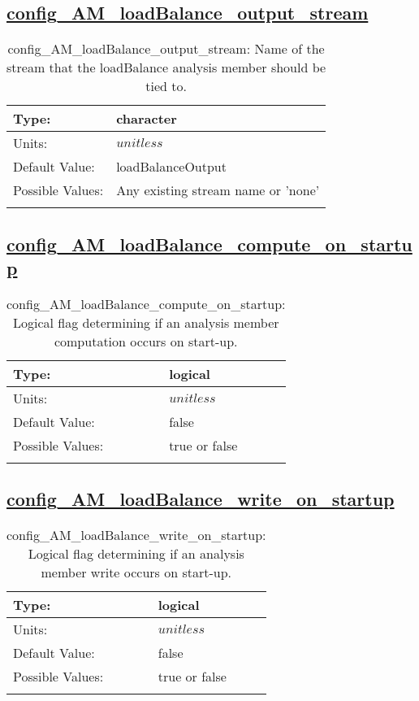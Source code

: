 \subsection[config\_AM\_loadBalance\_output\_stream]{\hyperref[sec:nm_tab_AM_loadBalance]{config\_AM\_loadBalance\_output\_stream}}
\label{subsec:nm_sec_config_AM_loadBalance_output_stream}
\begin{center}
\begin{longtable}{| p{2.0in} || p{4.0in} |}
    \hline
    Type: & character \\
    \hline
    Units: & $unitless$ \\
    \hline
    Default Value: & loadBalanceOutput \\
    \hline
    Possible Values: & Any existing stream name or 'none' \\
    \hline
    \caption{config\_AM\_loadBalance\_output\_stream: Name of the stream that the loadBalance analysis member should be tied to.}
\end{longtable}
\end{center}
\subsection[config\_AM\_loadBalance\_compute\_on\_startup]{\hyperref[sec:nm_tab_AM_loadBalance]{config\_AM\_loadBalance\_compute\_on\_startup}}
\label{subsec:nm_sec_config_AM_loadBalance_compute_on_startup}
\begin{center}
\begin{longtable}{| p{2.0in} || p{4.0in} |}
    \hline
    Type: & logical \\
    \hline
    Units: & $unitless$ \\
    \hline
    Default Value: & false \\
    \hline
    Possible Values: & true or false \\
    \hline
    \caption{config\_AM\_loadBalance\_compute\_on\_startup: Logical flag determining if an analysis member computation occurs on start-up.}
\end{longtable}
\end{center}
\subsection[config\_AM\_loadBalance\_write\_on\_startup]{\hyperref[sec:nm_tab_AM_loadBalance]{config\_AM\_loadBalance\_write\_on\_startup}}
\label{subsec:nm_sec_config_AM_loadBalance_write_on_startup}
\begin{center}
\begin{longtable}{| p{2.0in} || p{4.0in} |}
    \hline
    Type: & logical \\
    \hline
    Units: & $unitless$ \\
    \hline
    Default Value: & false \\
    \hline
    Possible Values: & true or false \\
    \hline
    \caption{config\_AM\_loadBalance\_write\_on\_startup: Logical flag determining if an analysis member write occurs on start-up.}
\end{longtable}
\end{center}
